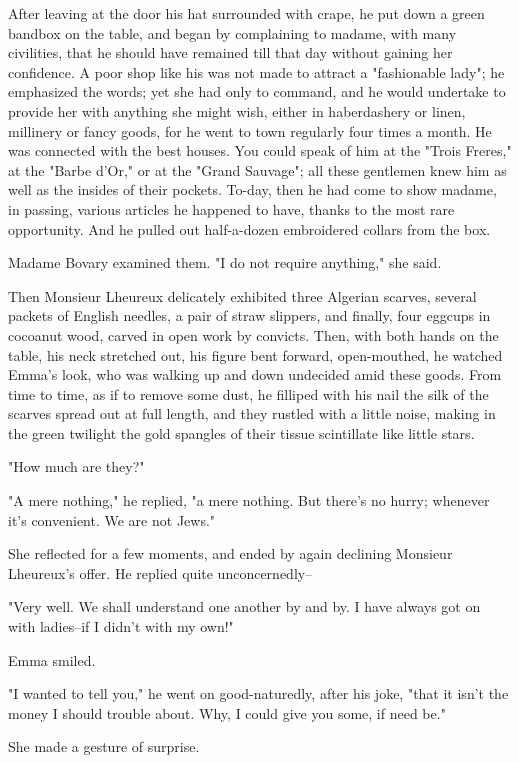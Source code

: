 \documentclass{tufte-book}
\begin{document}
After leaving at the door his hat surrounded with crape, he put down
a green bandbox on the table, and began by complaining to madame, with
many civilities, that he should have remained till that day without
gaining her confidence. A poor shop like his was not made to attract
a "fashionable lady"; he emphasized the words; yet she had only to
command, and he would undertake to provide her with anything she might
wish, either in haberdashery or linen, millinery or fancy goods, for
he went to town regularly four times a month. He was connected with the
best houses. You could speak of him at the "Trois Freres," at the "Barbe
d'Or," or at the "Grand Sauvage"; all these gentlemen knew him as
well as the insides of their pockets. To-day, then he had come to show
madame, in passing, various articles he happened to have, thanks to
the most rare opportunity. And he pulled out half-a-dozen embroidered
collars from the box.

Madame Bovary examined them. "I do not require anything," she said.

Then Monsieur Lheureux delicately exhibited three Algerian scarves,
several packets of English needles, a pair of straw slippers, and
finally, four eggcups in cocoanut wood, carved in open work by convicts.
Then, with both hands on the table, his neck stretched out, his figure
bent forward, open-mouthed, he watched Emma's look, who was walking up
and down undecided amid these goods. From time to time, as if to remove
some dust, he filliped with his nail the silk of the scarves spread
out at full length, and they rustled with a little noise, making in the
green twilight the gold spangles of their tissue scintillate like little
stars.

"How much are they?"

"A mere nothing," he replied, "a mere nothing. But there's no hurry;
whenever it's convenient. We are not Jews."

She reflected for a few moments, and ended by again declining Monsieur
Lheureux's offer. He replied quite unconcernedly--

"Very well. We shall understand one another by and by. I have always got
on with ladies--if I didn't with my own!"

Emma smiled.

"I wanted to tell you," he went on good-naturedly, after his joke, "that
it isn't the money I should trouble about. Why, I could give you some,
if need be."

She made a gesture of surprise.
\end{document}
